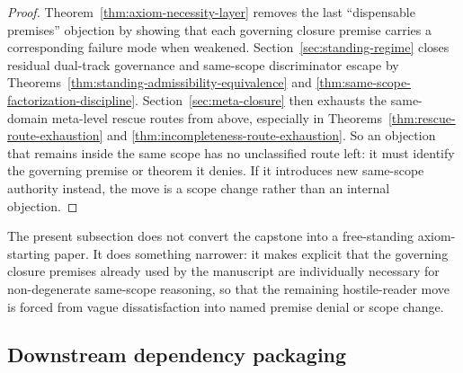 \begin{proof}
Theorem~\ref{thm:axiom-necessity-layer} removes the last ``dispensable premises'' objection by showing that each governing closure premise carries a corresponding failure mode when weakened. Section~\ref{sec:standing-regime} closes residual dual-track governance and same-scope discriminator escape by Theorems~\ref{thm:standing-admissibility-equivalence} and \ref{thm:same-scope-factorization-discipline}. Section~\ref{sec:meta-closure} then exhausts the same-domain meta-level rescue routes from above, especially in Theorems~\ref{thm:rescue-route-exhaustion} and \ref{thm:incompleteness-route-exhaustion}. So an objection that remains inside the same scope has no unclassified route left: it must identify the governing premise or theorem it denies. If it introduces new same-scope authority instead, the move is a scope change rather than an internal objection.
\end{proof}

\begin{remark}
The present subsection does not convert the capstone into a free-standing axiom-starting paper. It does something narrower: it makes explicit that the governing closure premises already used by the manuscript are individually necessary for non-degenerate same-scope reasoning, so that the remaining hostile-reader move is forced from vague dissatisfaction into named premise denial or scope change.
\end{remark}

\subsection{Downstream dependency packaging}

